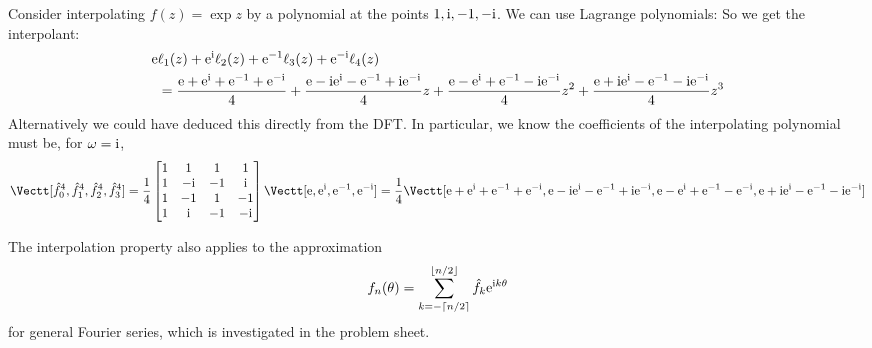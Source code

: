 \begin{example} Consider interpolating $f(z) = \exp z$ by a polynomial at the points $1, {\rm i}, -1, -{\rm i}$. We can use Lagrange polynomials:
So we get the interpolant:
\begin{align*}
{\rm e} & \ell_1(z) + {\rm e}^{\rm i} \ell_2(z) + {\rm e}^{-1} \ell_3(z) + {\rm e}^{-{\rm i}} \ell_4(z) \\
 &= 
{{\rm e} + {\rm e}^{\rm i} + {\rm e}^{-1} + {\rm e}^{-{\rm i}} \over 4} +
{{\rm e} - {\rm i} {\rm e}^{\rm i} - {\rm e}^{-1} + {\rm i} {\rm e}^{-{\rm i}} \over 4} z +
 {{\rm e} - {\rm e}^{\rm i} + {\rm e}^{-1} - {\rm i} {\rm e}^{-{\rm i}} \over 4} z^2 +
 {{\rm e} + {\rm i} {\rm e}^{\rm i} - {\rm e}^{-1} - {\rm i} {\rm e}^{-{\rm i}} \over 4} z^3 
\end{align*}
Alternatively we could have deduced this directly from the DFT. In particular, we know the coefficients of the interpolating polynomial must be, for $\omega = {\rm i}$,
\[
\Vectt[\hat f_0^4, \hat f_1^4, \hat f_2^4, \hat f_3^4] = 
{1 \over 4} \begin{bmatrix}1 & 1 & 1 & 1 \\
                            1 & -\I & -1 & \I \\
                            1 & -1 & 1 & -1 \\
                            1 & \I & -1 & -\I
                            \end{bmatrix}
 \Vectt[\E, \E^\I, \E^{-1}, \E^{-\I}] = {1 \over 4} \Vectt[\E + \E^\I + \E^{-1} + \E^{-\I} ,
 \E -\I \E^\I - \E^{-1} + \I \E^{-\I} ,
 \E - \E^\I + \E^{-1} - \E^{-\I} ,
 \E + \I \E^\I - \E^{-1} - \I \E^{-\I}
 ]
\]
\end{example}

The interpolation property also applies to the approximation
\[
f_n(\ensuremath{\theta}) = \ensuremath{\sum}_{k=-\ensuremath{\lceil}n/2\ensuremath{\rceil}}^{\ensuremath{\lfloor}n/2\ensuremath{\rfloor}} \hat f_k {\rm e}^{{\rm i} k \ensuremath{\theta}}
\]
for general Fourier series, which is investigated in the problem sheet.




